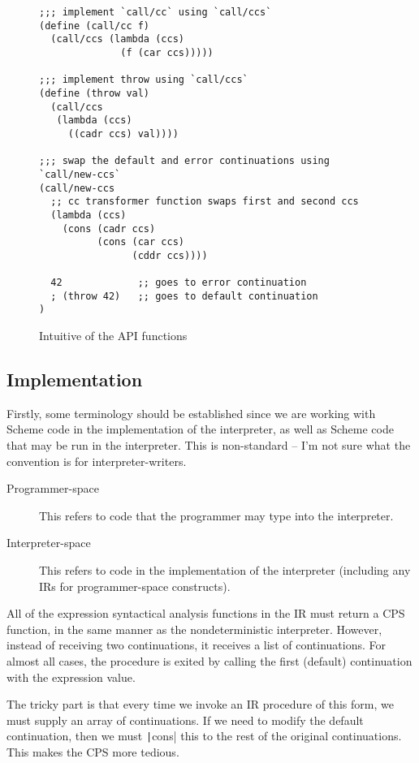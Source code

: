 \documentclass[]{article}
\begin{document}
\begin{figure}
  \centering
\begin{verbatim}
;;; implement `call/cc` using `call/ccs`
(define (call/cc f)
  (call/ccs (lambda (ccs)
              (f (car ccs)))))

;;; implement throw using `call/ccs`
(define (throw val)
  (call/ccs
   (lambda (ccs)
     ((cadr ccs) val))))

;;; swap the default and error continuations using `call/new-ccs`
(call/new-ccs
  ;; cc transformer function swaps first and second ccs
  (lambda (ccs)
    (cons (cadr ccs)
          (cons (car ccs)
                (cddr ccs))))

  42             ;; goes to error continuation
  ; (throw 42)   ;; goes to default continuation
)
\end{verbatim}
  \caption{Intuitive of the API functions}
  \label{fig:demo}
\end{figure}

\subsection{Implementation}
\label{sec:arch}

Firstly, some terminology should be established since we are working with Scheme code in the implementation of the interpreter, as well as Scheme code that may be run in the interpreter. This is non-standard -- I'm not sure what the convention is for interpreter-writers.
\begin{description}
\item[Programmer-space] This refers to code that the programmer may type into the interpreter.
\item[Interpreter-space] This refers to code in the implementation of the interpreter (including any IRs for programmer-space constructs).
\end{description}

All of the expression syntactical analysis functions in the IR must return a CPS function, in the same manner as the nondeterministic interpreter. However, instead of receiving two continuations, it receives a list of continuations. For almost all cases, the procedure is exited by calling the first (default) continuation with the expression value.

The tricky part is that every time we invoke an IR procedure of this form, we must supply an array of continuations. If we need to modify the default continuation, then we must \texttt|cons| this to the rest of the original continuations. This makes the CPS more tedious.
\end{document}
